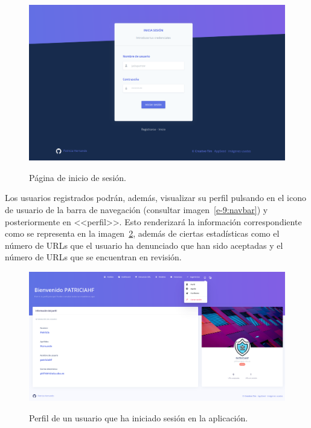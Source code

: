 \begin{figure}[h]
	\caption[Manual de usuario: inicio de sesión]{Página de inicio de sesión.}
	\centering
	\includegraphics[width=\textwidth]{../img/anexos/user_guide/8_login}
	\label{e-8:login}
\end{figure}

Los usuarios registrados podrán, además, visualizar su perfil pulsando en el icono de usuario de la barra de navegación (consultar imagen~\ref{e-9:navbar}) y posteriormente en <<perfil>>. Esto renderizará la información correspondiente como se representa en la imagen~\ref{e-8:profile}, además de ciertas estadísticas como el número de URLs que el usuario ha denunciado que han sido aceptadas y el número de URLs que se encuentran en revisión.

\begin{figure}[h]
	\caption[Manual de usuario: perfil]{Perfil de un usuario que ha iniciado sesión en la aplicación.}
	\centering
	\includegraphics[width=\textwidth]{../img/anexos/user_guide/8_profile}
	\label{e-8:profile}
\end{figure}

